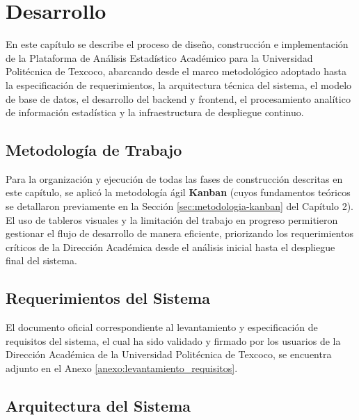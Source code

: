 \chapter{Desarrollo}

En este capítulo se describe el proceso de diseño, construcción e implementación de la Plataforma de Análisis Estadístico Académico para la Universidad Politécnica de Texcoco, abarcando desde el marco metodológico adoptado hasta la especificación de requerimientos, la arquitectura técnica del sistema, el modelo de base de datos, el desarrollo del backend y frontend, el procesamiento analítico de información estadística y la infraestructura de despliegue continuo.

\section{Metodología de Trabajo}

Para la organización y ejecución de todas las fases de construcción descritas en este capítulo, se aplicó la metodología ágil \textbf{Kanban} (cuyos fundamentos teóricos se detallaron previamente en la Sección \ref{sec:metodologia-kanban} del Capítulo 2). El uso de tableros visuales y la limitación del trabajo en progreso permitieron gestionar el flujo de desarrollo de manera eficiente, priorizando los requerimientos críticos de la Dirección Académica desde el análisis inicial hasta el despliegue final del sistema.

\section{Requerimientos del Sistema}
\label{sec:requerimientos}

El documento oficial correspondiente al levantamiento y especificación de requisitos del sistema, el cual ha sido validado y firmado por los usuarios de la Dirección Académica de la Universidad Politécnica de Texcoco, se encuentra adjunto en el Anexo \ref{anexo:levantamiento_requisitos}.

\section{Arquitectura del Sistema}

